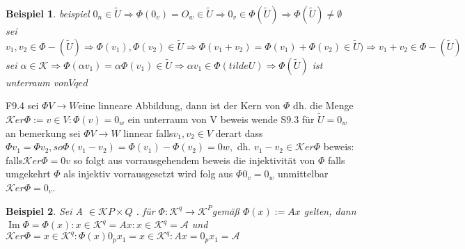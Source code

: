 \documentclass[11pt]{article}
\newtheorem{beispiel}{Beispiel}
\DeclareMathOperator{\IM}{Im}
\begin{document}
\begin{beispiel}
  beispiel $0_n \in \tilde{U} \Rightarrow \Phi(0_v)= O_w \in \tilde{U} \Rightarrow 0_v \in \Phi(\tilde{U} ) \Rightarrow \Phi(\tilde{U} ) \neq \emptyset$
sei $v_1, v_2 \in \Phi-(\tilde{U} ) \Rightarrow \Phi (v_1),\Phi(v_2) \in\tilde{U}  \Rightarrow \Phi (v_1+v_2)= \Phi (v_1)+\Phi(v_2) \in \tilde{U} ) \Rightarrow v_1+v_2 \in \Phi-(\tilde{U} ) $
sei $\alpha \in\mathcal{K}\Rightarrow \Phi(\alpha v_1)= \alpha \Phi(v_1) \in \tilde{U} \Rightarrow \alpha v_1 \in \Phi (tilde{U})\Rightarrow \Phi (\tilde{U} )$ ist unterraum von$ V  qed$

\end{beispiel}
F9.4
sei $\Phi V \rightarrow W $eine  linneare Abbildung, dann ist der Kern von $\Phi$ dh. die Menge$ \mathcal{K}er \Phi := {v \in V:\Phi (v) = 0_w}$ ein unterraum von V
beweis wende S9.3 für $\tilde{U}=0_w $an
bemerkung sei $\Phi V \rightarrow W $ linnear falls$ v_1, v_2  \in V$  derart dass 
$\Phi v_1 = \Phi v_2, so \Phi(v_1-v_2)=\Phi(v_1)-\Phi(v_2)= 0w, $ dh.
$ v_1-v_2\in \mathcal{K}er \Phi$
beweis: falls$ \mathcal{K}er \Phi ={0v}$ so folgt aus vorrausgehendem beweis die injektivität von $\Phi$
falls umgekehrt  $\Phi$ als injektiv vorrausgesetzt wird folg aus $\Phi 0_v = 0_w$ unmittelbar$ \mathcal{K}er\Phi={0_v}$.
\begin{beispiel}
 Sei A $\in \mathcal{K}P\times Q$ . für $\Phi: \mathcal{K}^q \rightarrow \mathcal{K}^P $gemäß $\Phi (x):= Ax$ gelten, dann 
$\IM \Phi = {\Phi (x): x \in \mathcal{K}^q}= {Ax:x\in \mathcal{K} ^q}=\mathcal{A}$
und $\mathcal{K}er \Phi = {x \in \mathcal{K} ^q: \Phi (x)0_px_1}={x \in \mathcal{K}^q: Ax= 0_px_1}=\mathcal{A}$
\end{beispiel}
\end{document}
